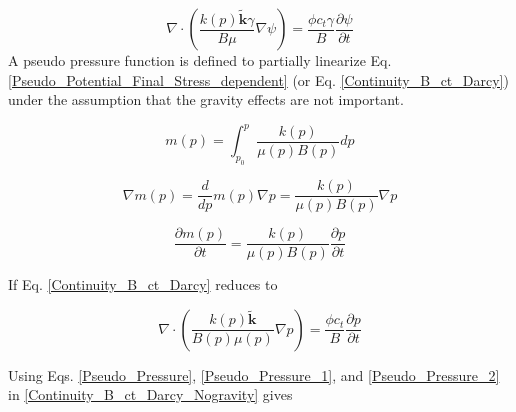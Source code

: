 \documentclass{llncs}
\numberwithin{equation}{section}
\numberwithin{figure}{section}
\numberwithin{table}{section}
\begin{document}
    \begin{equation}
        \nabla \cdot \left( \frac{k\left( p \right)\widetilde{\mathbf{k}}\gamma }{B\mu }\nabla \psi  \right)=\frac{\phi {{c}_{t}}\gamma }{B}\frac{\partial \psi }{\partial t}
    \label{Pseudo_Potential_Final_Stress_dependent}
    \end{equation}
    A pseudo pressure function is defined to partially linearize Eq. \ref{Pseudo_Potential_Final_Stress_dependent} (or Eq. \ref{Continuity_B_ct_Darcy}) under the assumption that the gravity effects are not important.

    \begin{equation}
        m\left( p \right)=\int_{{{p}_{0}}}^{p}{\frac{k\left( p \right)}{\mu \left( p \right)B\left( p \right)}dp}
    \label{Pseudo_Pressure}
    \end{equation}

    \begin{equation}
        \nabla m\left( p \right)=\frac{d}{dp}m\left( p \right)\nabla p=\frac{k\left( p \right)}{\mu \left( p \right)B\left( p \right)}\nabla p
    \label{Pseudo_Pressure_1}
    \end{equation}

    \begin{equation}
        \frac{\partial m\left( p \right)}{\partial t}=\frac{k\left( p \right)}{\mu \left( p \right)B\left( p \right)}\frac{\partial p}{\partial t}
    \label{Pseudo_Pressure_2}
    \end{equation}

    If  Eq. \ref{Continuity_B_ct_Darcy} reduces to

    \begin{equation}
        \nabla \cdot \left( \frac{k\left( p \right)\widetilde{\mathbf{k}}}{B\left( p \right)\mu \left( p \right)}\nabla p \right)=\frac{\phi {{c}_{t}}}{B}\frac{\partial p}{\partial t}
    \label{Continuity_B_ct_Darcy_Nogravity}
    \end{equation}

    Using Eqs. \ref{Pseudo_Pressure}, \ref{Pseudo_Pressure_1}, and \ref{Pseudo_Pressure_2} in \ref{Continuity_B_ct_Darcy_Nogravity} gives
\end{document}

